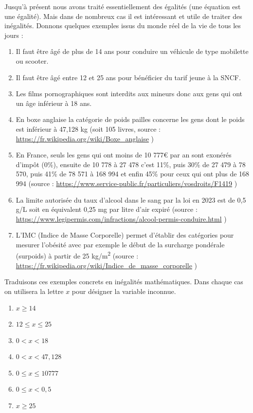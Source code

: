 \documentclass[a4paper, 11pt, twoside]{book}
\begin{document}
Jusqu'à présent nous avons traité essentiellement des égalités (une
équation est une égalité). Mais dans de nombreux cas il est
intéressant et utile de traiter des inégalités. Donnons quelques
exemples issus du monde réel de la vie de tous les jours :
\begin{enumerate}
\item Il faut être âgé de plus de 14 ans pour conduire un véhicule de
type mobilette ou scooter.
\item Il faut être âgé entre 12 et 25 ans pour bénéficier du tarif
jeune à la SNCF.
\item Les films pornographiques sont interdits aux mineurs donc aux
gens qui ont un âge inférieur à 18 ans.
\item En boxe anglaise la catégorie de poids pailles concerne les gens
dont le poids est inférieur à 47,128 kg (soit 105 livres, source :
\url{https://fr.wikipedia.org/wiki/Boxe\_anglaise} )
\item En France, seuls les gens qui ont moins de 10 777€ par an sont
exonérés d'impôt (0\%), ensuite de 10 778 à 27 478 c'est 11\%,
puis 30\% de 27 479 à 78 570, puis 41\% de 78 571 à 168 994 et
enfin 45\% pour ceux qui ont plus de 168 994 (source :
\url{https://www.service-public.fr/particuliers/vosdroits/F1419} )
\item La limite autorisée du taux d'alcool dans le sang par la loi en
2023 est de 0,5 g/L soit en équivalent 0,25 mg par litre d'air
expiré (source :
\url{https://www.legipermis.com/infractions/alcool-permis-conduire.html}
)
\item L'IMC (Indice de Masse Corporelle) permet d'établir des
catégories pour mesurer l'obésité avec par exemple le début de la
surcharge pondérale (surpoids) à partir de 25 kg/m\textsuperscript{2} (source :
\url{https://fr.wikipedia.org/wiki/Indice\_de\_masse\_corporelle} )
\end{enumerate}

Traduisons ces exemples concrets en inégalités mathématiques. Dans
chaque cas on utilisera la lettre \(x\) pour désigner la variable
inconnue.

\begin{enumerate}
\item \(x \geq 14\)
\item \(12 \leq x \leq 25\)
\item \(0 < x < 18\)
\item \(0 < x < 47,128\)
\item \(0 \leq x \leq 10 777\)
\item \(0 \leq x < 0,5\)
\item \(x \geq 25\)
\end{enumerate}
\end{document}
